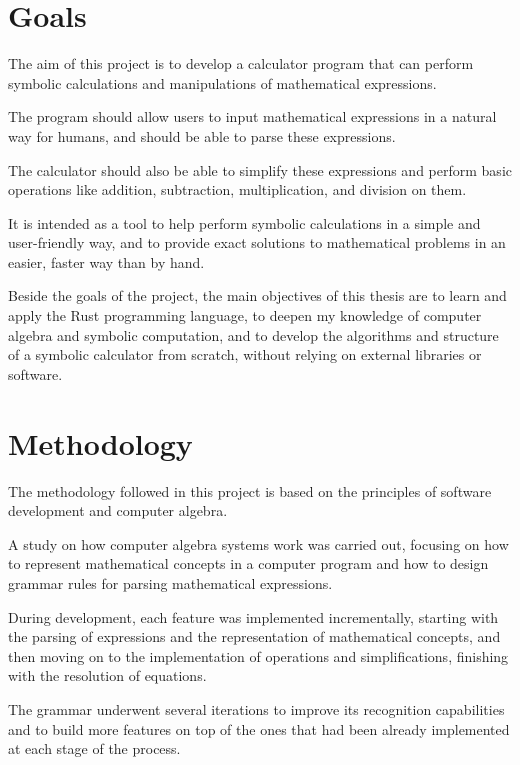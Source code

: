 \section{Goals}\label{sec:objectives}

The aim of this project is to develop a calculator program that can perform symbolic calculations and manipulations of mathematical expressions.

The program should allow users to input mathematical expressions in a natural way for humans, and should be able to parse these expressions.

The calculator should also be able to simplify these expressions and perform basic operations like addition, subtraction, multiplication, and division on them.

It is intended as a tool to help perform symbolic calculations in a simple and user-friendly way, and to provide exact solutions to mathematical problems in an easier, faster way than by hand.

Beside the goals of the project, the main objectives of this thesis are to learn and apply the Rust programming language, to deepen my knowledge of computer algebra and symbolic computation, and to develop the algorithms and structure of a symbolic calculator from scratch, without relying on external libraries or software.

\section{Methodology}\label{sec:methodology}

The methodology followed in this project is based on the principles of software development and computer algebra.

A study on how computer algebra systems work was carried out, focusing on how to represent mathematical concepts in a computer program and how to design grammar rules for parsing mathematical expressions.

During development, each feature was implemented incrementally, starting with the parsing of expressions and the representation of mathematical concepts, and then moving on to the implementation of operations and simplifications, finishing with the resolution of equations.

The grammar underwent several iterations to improve its recognition capabilities and to build more features on top of the ones that had been already implemented at each stage of the process.

